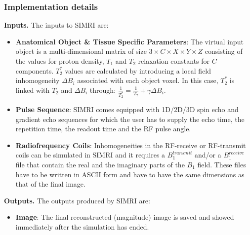 \hfill

\subsubsection{Implementation details}

\textbf{Inputs.} The inputs to SIMRI are:

\begin{itemize}
    
    \item \textbf{Anatomical Object \& Tissue Specific Parameters}:
     The virtual input object is a multi-dimensional matrix of size $3 \times C \times X \times Y \times Z$ consisting of the values for proton density, $T_1$ and $T_2$ relaxation constants for $C$ components.
     $T_2^*$ values are calculated by introducing a local field inhomogeneity $\Delta B_i$ associated with each object voxel.
     In this case, $T_2^*$ is linked with $T_2$ and $\Delta B_i$ through: $\frac{1}{T_2^*} = \frac{1}{T_2} + \gamma \Delta B_i$.
     
    \item \textbf{Pulse Sequence}: SIMRI comes equipped with 1D/2D/3D spin echo and gradient echo sequences for which the user has to supply the echo time, the repetition time, the readout time and the RF pulse angle. 
    
    \item \textbf{Radiofrequency Coils}: Inhomogeneities in the RF-receive or RF-transmit coils can be simulated in SIMRI and it requires a $B_1^{transmit}$ and/or a $B_1^{receive}$ file that contain the real and the imaginary parts of the $B_1$ field.
    These files have to be written in ASCII form and have to have the same dimensions as that of the final image.
    
    
\end{itemize}

\hfill

\textbf{Outputs.} The outputs produced by SIMRI are:
\begin{itemize}
    
    \item \textbf{Image}: The final reconstructed (magnitude) image is saved and showed immediately after the simulation has ended.
    
\end{itemize}

